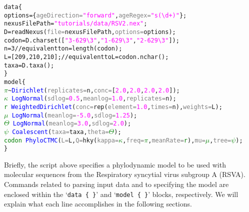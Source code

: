 \documentclass[10pt,letterpaper,table]{article}
\begin{document}
{
\small
\begin{alltt}
data \{
  options = \{\textcolor{gray}{ageDirection=}\textcolor{magenta}{"forward"}, \textcolor{gray}{ageRegex=}\textcolor{magenta}{"s(\textbackslash{}d+)"}\};
  nexusFilePath = \textcolor{magenta}{"tutorials/data/RSV2.nex"};
  D = \textcolor{magenta!80!black}{readNexus}(\textcolor{gray}{file=}nexusFilePath, \textcolor{gray}{options=}options);
  codon = D.\textcolor{magenta!80!black}{charset}([\textcolor{magenta}{"3-629\textbackslash{}3"}, \textcolor{magenta}{"1-629\textbackslash{}3"}, \textcolor{magenta}{"2-629\textbackslash{}3"}]);
  n = 3 // equivalent to n = length(codon);
  L = [209, 210, 210]; // equivalent to L = codon.nchar();
  taxa = D.\textcolor{magenta!80!black}{taxa}();
\}
model \{
  \textcolor{green}{\(\pi\)} \textasciitilde \textcolor{blue}{Dirichlet}(\textcolor{gray}{replicates=}n, \textcolor{gray}{conc=}[\textcolor{magenta}{2.0}, \textcolor{magenta}{2.0}, \textcolor{magenta}{2.0}, \textcolor{magenta}{2.0}]);
  \textcolor{green}{\(\kappa\)} ~ \textcolor{blue}{LogNormal}(\textcolor{gray}{sdlog=}\textcolor{magenta}{0.5}, \textcolor{gray}{meanlog=}\textcolor{magenta}{1.0}, \textcolor{gray}{replicates=}n);
  \textcolor{green}{r} ~ \textcolor{blue}{WeightedDirichlet}(\textcolor{gray}{conc=}\textcolor{magenta!80!black}{rep}(\textcolor{gray}{element=}\textcolor{magenta}{1.0}, \textcolor{gray}{times=}n), \textcolor{gray}{weights=}L);
  \textcolor{green}{\(\mu\)} ~ \textcolor{blue}{LogNormal}(\textcolor{gray}{meanlog=}\textcolor{magenta}{-5.0}, \textcolor{gray}{sdlog=}\textcolor{magenta}{1.25});
  \textcolor{green}{\(\Theta\)} ~ \textcolor{blue}{LogNormal}(\textcolor{gray}{meanlog=}\textcolor{magenta}{3.0}, \textcolor{gray}{sdlog=}\textcolor{magenta}{2.0});
  \textcolor{green}{\(\psi\)} ~ \textcolor{blue}{Coalescent}(\textcolor{gray}{taxa=}taxa, \textcolor{gray}{theta=}\textcolor{green}{\(\Theta\)});
  \textcolor{green}{codon} ~ \textcolor{blue}{PhyloCTMC}(\textcolor{gray}{L=}L, \textcolor{gray}{Q=}\textcolor{magenta!80!black}{hky}(\textcolor{gray}{kappa=}\textcolor{green}{\(\kappa\)}, \textcolor{gray}{freq=}\textcolor{green}{\(\pi\)}, \textcolor{gray}{meanRate=}\textcolor{green}{r}), \textcolor{gray}{mu=}\textcolor{green}{\(\mu\)}, \textcolor{gray}{tree=}\textcolor{green}{\(\psi\)});
\}
\end{alltt}
}

Briefly, the script above specifies a phylodynamic model to be used
with molecular sequences from the Respiratory syncytial virus subgroup
A (RSVA).
Commands related to parsing input data and to specifying the model are
enclosed within the `\texttt{data \{ \}}' and `\texttt{model \{ \}}'
blocks, respectively.
We will explain what each line accomplishes in the following sections.
\end{document}

